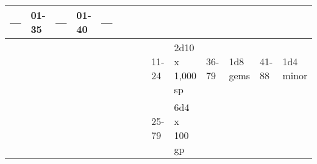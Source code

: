 \begin{longtable}{llllllllllllll}
{\begin{minipage}[t]{0.469in}
---\end{minipage}} & \multicolumn{1}{p{0.923in}|}{\begin{minipage}[t]{0.923in}\raggedright
01-35\end{minipage}} & \multicolumn{1}{p{0.469in}|}{\begin{minipage}[t]{0.469in}\raggedright
---\end{minipage}} & \multicolumn{1}{p{0.626in}|}{\begin{minipage}[t]{0.626in}\raggedright
01-40\end{minipage}} & \multicolumn{1}{p{0.469in}|}{\begin{minipage}[t]{0.469in}\centering
---\end{minipage}}\\
\hline
\multicolumn{8}{p{1.150in}|}{\begin{minipage}[t]{1.150in}\centering
\end{minipage}} & \multicolumn{1}{|p{0.393in}|}{\begin{minipage}[t]{0.393in}\raggedright
11-24\end{minipage}} & \multicolumn{1}{p{0.469in}|}{\begin{minipage}[t]{0.469in}\raggedright
2d10 x 1,000 sp\end{minipage}} & \multicolumn{1}{p{0.923in}|}{\begin{minipage}[t]{0.923in}\raggedright
36-79\end{minipage}} & \multicolumn{1}{p{0.469in}|}{\begin{minipage}[t]{0.469in}\raggedright
1d8 gems\end{minipage}} & \multicolumn{1}{p{0.626in}|}{\begin{minipage}[t]{0.626in}\raggedright
41-88\end{minipage}} & \multicolumn{1}{p{0.469in}|}{\begin{minipage}[t]{0.469in}\centering
1d4 minor\end{minipage}}\\
\hline
\multicolumn{8}{p{1.150in}|}{\begin{minipage}[t]{1.150in}\centering
\end{minipage}} & \multicolumn{1}{|p{0.393in}|}{\begin{minipage}[t]{0.393in}\raggedright
25-79\end{minipage}} & \multicolumn{1}{p{0.469in}|}{\begin{minipage}[t]{0.469in}\raggedright
6d4 x 100 gp\end{minipage}} & \multicolumn{1}{p{0.923in}|}{\begin{minipage}[t]{0.923in}\raggedright

\end{minipage}}
\end{longtable}
